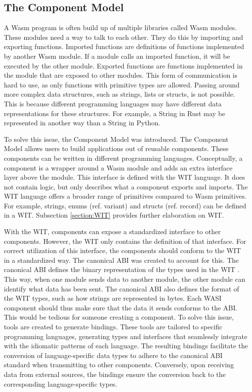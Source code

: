 \subsection{The Component Model}
\label{section:thecomponentmodel}

A \acrshort{Wasm} program is often build up of multiple libraries called Wasm modules. These modules need a way to talk to each other. They do this by importing and exporting functions. Imported functions are definitions of functions implemented by another Wasm module. If a module calls an imported function, it will be executed by the other module. Exported functions are functions implemented in the module that are exposed to other modules. 
This form of communication is hard to use, as only functions with primitive types are allowed. Passing around more complex data structures, such as strings, lists or structs, is not possible. This is because different programming languages may have different data representations for these structures. For example, a String in Rust may be represented in another way than a String in Python.

To solve this issue, the Component Model was introduced. The Component Model allows users to build applications out of reusable components. These components can be written in different programming languages. Conceptually, a component is a wrapper around a \acrshort{Wasm} module and adds an extra interface layer above the module. This interface is defined with the \acrshort{WIT} language. It does not contain logic, but only describes what a component exports and imports. The \acrshort{WIT} language offers a broader range of primitives compared to \acrshort{Wasm} primitives. For example, strings, enums (ref. variant) and structs (ref. record) can be defined in a \acrshort{WIT}. Subsection \ref{section:WIT} provides further elaboration on WIT.

With the \acrshort{WIT}, components can expose a standardized interface to other components. However, the \acrshort{WIT} only contains the definition of that interface. For correct utilization of this interface, the components should conform to the \acrshort{WIT} in a standardized way. The canonical \acrshort{ABI} was created to account for this. The canonical \acrshort{ABI} defines the binary representation of the types used in the \acrshort{WIT} \cite{canonical_abi}. This way, when one module sends data to another module, the other module can identify what data has been sent. The canonical \acrshort{ABI} also defines the format of the \acrshort{WIT} types, such as how strings are represented in bytes. Each \acrshort{WASI} component should thus make sure that the data it sends conforms to the ABI. This would be tedious for someone creating a component. To solve this issue, tools are created to generate bindings. These tools are tailored to specific programming languages, generating types and interfaces that seamlessly integrate with the idiomatic patterns of each language. The resulting bindings facilitate the conversion of language-specific data types to adhere to the canonical ABI standard when transmitting to other components. Conversely, upon receiving data from external sources, the bindings ensure the conversion back to the corresponding language-specific types.

